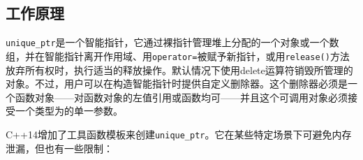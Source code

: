 
\subsection{工作原理}



\texttt{unique\_\allowbreak{}ptr}是一个智能指针，它通过裸指针管理堆上分配的一个对象或一个数组，并在智能指针离开作用域、用\texttt{operator=}被赋予新指针，或用\texttt{release()}方法放弃所有权时，执行适当的释放操作。默认情况下使用delete运算符销毁所管理的对象。不过，用户可以在构造智能指针时提供自定义删除器。这个删除器必须是一个函数对象——对函数对象的左值引用或函数均可——并且这个可调用对象必须接受一个类型为的单一参数。



C++14增加了工具函数模板来创建\texttt{unique\_\allowbreak{}ptr}。它在某些特定场景下可避免内存泄漏，但也有一些限制：



